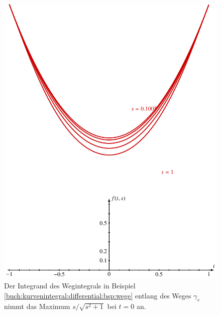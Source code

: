 %
%
%
\begin{figure}
\centering
\includegraphics{chapters/030-kurvenintegral/images/integrand.pdf}
\caption{Der Integrand des Wegintegrals in Beispiel 
\ref{buch:kurvenintegral:differential:bsp:wege}
entlang des Weges $\gamma_s$ nimmt
das Maximum $s/\sqrt{s^2+1}$ bei $t=0$ an.
\label{buch:kurvenintegral:differential:fig:integrand}}
\end{figure}
